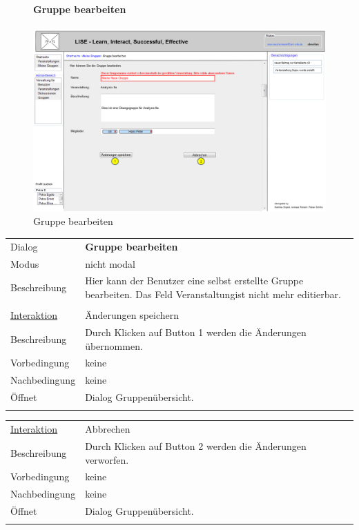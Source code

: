 \documentclass[12pt,a4paper]{article}
\begin{document}
{\begin{figure}[H]
	\paragraph{Gruppe bearbeiten}
	\includegraphics[width=\textwidth]{Bilder/Mockups/GUI/GruppeBearbeiten.png}
	\caption{Gruppe bearbeiten}
	\label{GuiGruppeBearbeiten}
\end{figure}
\begin{tabular}{l p{12cm}}
	Dialog 	 & \textbf{Gruppe bearbeiten} \\ 
	Modus & nicht modal\\ 
	Beschreibung   	& Hier kann der Benutzer eine selbst erstellte Gruppe bearbeiten. Das Feld \glqq Veranstaltung\grqq ist nicht mehr editierbar. \\\\
	
	\underline{Interaktion} 	 & Änderungen speichern\\ 
	Beschreibung   	& Durch Klicken auf Button 1 werden die Änderungen übernommen.\\
	Vorbedingung	& keine \\
	Nachbedingung	& keine \\
	Öffnet			& Dialog \glqq Gruppenübersicht\grqq.\\\\
\end{tabular}

\begin{tabular}{l p{12cm}}
	\underline{Interaktion} 	 & Abbrechen\\ 
	Beschreibung   	& Durch Klicken auf Button 2 werden die Änderungen verworfen.\\
	Vorbedingung	& keine \\
	Nachbedingung	& keine \\
	Öffnet			& Dialog \glqq Gruppenübersicht\grqq.\\\\
\end{tabular}

}
\end{document}
